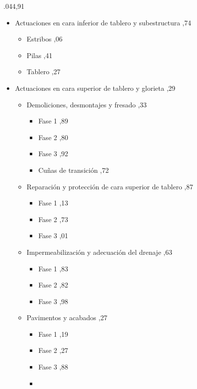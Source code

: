 \documentclass{book}%
\begin{document}
\begin{itemize}
.044,91%
\begin{itemize}%
\item%
Actuaciones en cara inferior de tablero y subestructura%
,74%
\begin{itemize}%
\item%
Estribos%
,06%
\item%
Pilas%
,41%
\item%
Tablero%
,27%
\end{itemize}%
\item%
Actuaciones en cara superior de tablero y glorieta%
,29%
\begin{itemize}%
\item%
Demoliciones, desmontajes y fresado%
,33%
\begin{itemize}%
\item%
Fase 1%
,89%
\item%
Fase 2%
,80%
\item%
Fase 3%
,92%
\item%
Cuñas de transición%
,72%
\end{itemize}%
\item%
Reparación y protección de cara superior de tablero%
,87%
\begin{itemize}%
\item%
Fase 1%
,13%
\item%
Fase 2%
,73%
\item%
Fase 3%
,01%
\end{itemize}%
\item%
Impermeabilización y adecuación del drenaje%
,63%
\begin{itemize}%
\item%
Fase 1%
,83%
\item%
Fase 2%
,82%
\item%
Fase 3%
,98%
\end{itemize}%
\item%
Pavimentos y acabados%
,27%
\begin{itemize}%
\item%
Fase 1%
,19%
\item%
Fase 2%
,27%
\item%
Fase 3%
,88%
\item%

\end{itemize}
\end{itemize}
\end{itemize}
\end{itemize}
\end{document}
